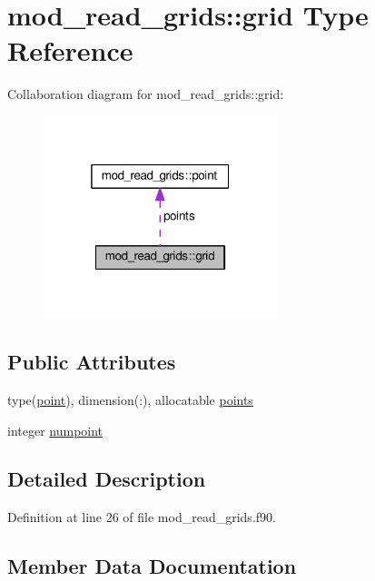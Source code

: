 \hypertarget{structmod__read__grids_1_1grid}{}\section{mod\+\_\+read\+\_\+grids\+:\+:grid Type Reference}
\label{structmod__read__grids_1_1grid}


Collaboration diagram for mod\+\_\+read\+\_\+grids\+:\+:grid\+:\nopagebreak
\begin{figure}[H]
\begin{center}
\leavevmode
\includegraphics[width=193pt]{structmod__read__grids_1_1grid__coll__graph}
\end{center}
\end{figure}
\subsection*{Public Attributes}
\begin{DoxyCompactItemize}
\item 
type(\hyperlink{structmod__read__grids_1_1point}{point}), dimension(\+:), allocatable \hyperlink{structmod__read__grids_1_1grid_aa276c61a9bfda811d98102170e4bfeaf}{points}
\item 
integer \hyperlink{structmod__read__grids_1_1grid_a71e57f105913758d04222ff4a0a33c5e}{numpoint}
\end{DoxyCompactItemize}


\subsection{Detailed Description}


Definition at line 26 of file mod\+\_\+read\+\_\+grids.\+f90.



\subsection{Member Data Documentation}
